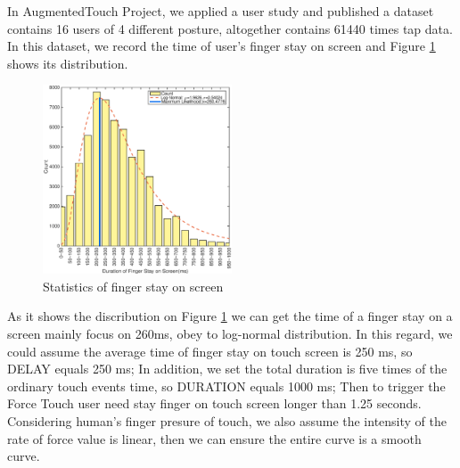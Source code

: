 %
In AugmentedTouch Project\cite{Changkun:2016}, we applied a user study and published a dataset contains 16 users of 4 different posture, altogether contains 61440 times tap data. In this dataset, we record the time of user's finger stay on screen and Figure \ref{fig:result} shows its distribution.

\begin{figure}[H]
    \kaishu
    \centering
    \includegraphics[width=0.5\textwidth]{figures/count-result}
    \caption{\kaishu Statistics of finger stay on screen}
    \label{fig:result}
\end{figure}

As it shows the discribution on Figure \ref{fig:result} we can get the time of a finger stay on a screen mainly focus on 260ms, obey to log-normal distribution.
In this regard, we could assume the average time of finger stay on touch screen is 250 ms, so DELAY equals 250 ms;
In addition, we set the total duration is five times of the ordinary touch events time, so DURATION equals 1000 ms;
Then to trigger the Force Touch user need stay finger on touch screen longer than 1.25 seconds.
Considering human's finger presure of touch, we also assume the intensity of the rate of force value is linear, then we can ensure the entire curve is a smooth curve.

